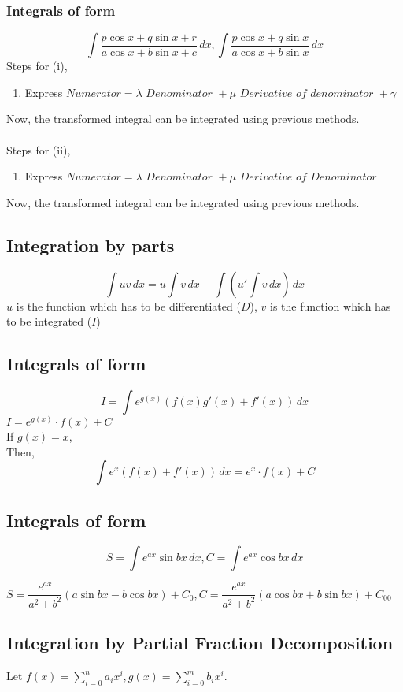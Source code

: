 \documentclass{article}
\begin{document}
\subsubsection{Integrals of form }
$$\int \dfrac{p\cos x + q \sin x +r}{a \cos x + b \sin x + c} \, dx , \int \dfrac{p \cos x + q \sin x }{a \cos x + b \sin x} \, dx $$
Steps for (i),
\begin{enumerate}[1.]
    \item Express $\textit{Numerator}= \lambda \textit{ Denominator } + \mu \textit{ Derivative of denominator } + \gamma$
\end{enumerate}
Now, the transformed integral can be integrated using previous methods.
\\ \\
Steps for (ii),
\begin{enumerate}[1.]
    \item Express $\textit{Numerator}=\lambda \textit{ Denominator } + \mu \textit{ Derivative of Denominator}$
\end{enumerate}
Now, the transformed integral can be integrated using previous methods.
\subsection{Integration by parts}

$$\int uv \, dx = u \int v \, dx - \int \left(u' \int v \, dx\right) \, dx$$
$u$ is the function which has to be differentiated ($D$), $v$ is the function which has to be integrated ($I$)

\subsection{Integrals of form }
$$I=\int e^{g(x)} \left(f(x)g'(x)+f'(x)\right) \, dx$$
$I=e^{g(x)} \cdot f(x) +C$
\\
If $g(x)=x$,
\\
Then, $$\displaystyle\int e^x \left(f(x)+f'(x)\right) \, dx=e^x \cdot f(x)+C$$

\subsection{Integrals of form }
$$S=\int e^{ax} \sin bx \, dx, C = \int e^{ax} \cos bx \, dx$$

$S=\dfrac{e^{ax}}{a^2+b^2}\left(a \sin bx -b \cos bx\right)+C_{0}, C=\dfrac{e^{ax}}{a^2+b^2}\left(a \cos bx + b \sin bx\right) + C_{00}$

\subsection{Integration by Partial Fraction Decomposition}
Let $f(x)=\displaystyle\sum_{i=0}^{n}a_{i}x^i, g(x)=\displaystyle\sum_{i=0}^{m} b_{i}x^i$.
\end{document}
